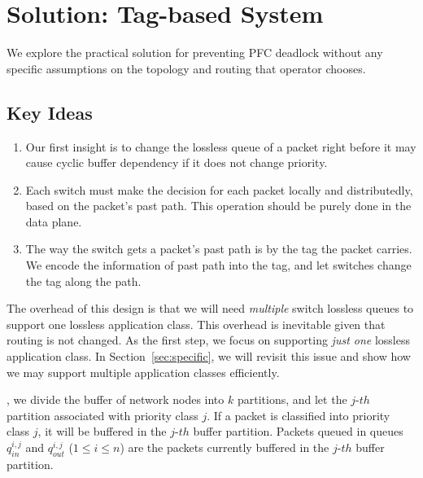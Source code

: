 \section{Solution: Tag-based System}\label{sec:generic}

We explore the practical solution for preventing PFC deadlock without any specific assumptions on the topology and routing that operator chooses.

\subsection{Key Ideas}

\begin{enumerate}
	\item Our first insight is to change the lossless queue of a packet right before it may cause cyclic buffer dependency if it does not change priority.
	
	\item Each switch must make the decision for each packet locally and distributedly, based on the packet's past path. This operation should be purely done in the
	data plane.

	\item The way the switch gets a packet's past path is by the tag the packet carries. We encode the information of past path into the tag, and let switches change 
	the tag along the path. 

\end{enumerate}

The overhead of this design is that we will need {\em multiple} switch lossless queues to support one lossless application class.
This overhead is inevitable given that routing is not changed. 
As the first step, we focus on supporting {\em just one} lossless application class. In Section~\ref{sec:specific}, we will revisit 
this issue and show how we may support multiple application classes efficiently.


, we divide the buffer of network nodes into $k$ partitions, and let the $j$-$th$ partition associated with priority class $j$. If a packet is classified into priority class $j$, it will  be buffered in the $j$-$th$ buffer partition. Packets queued in queues $q_{in}^{i,j}$ and $q_{out}^{i,j}$ ($1\leq i \leq n$) are the packets currently buffered in the $j$-$th$ buffer partition.


